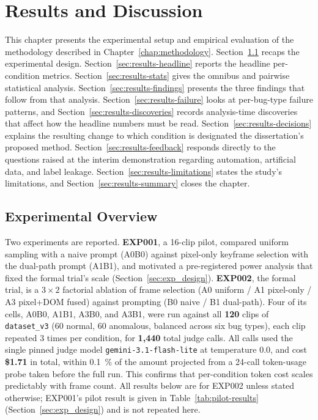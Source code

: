 \chapter{Results and Discussion}
\label{chap:results_and_discussion}
This chapter presents the experimental setup and empirical evaluation of the methodology described in Chapter~\ref{chap:methodology}. Section~\ref{sec:results-overview} recaps the experimental design. Section~\ref{sec:results-headline} reports the headline per-condition metrics. Section~\ref{sec:results-stats} gives the omnibus and pairwise statistical analysis. Section~\ref{sec:results-findings} presents the three findings that follow from that analysis. Section~\ref{sec:results-failure} looks at per-bug-type failure patterns, and Section~\ref{sec:results-discoveries} records analysis-time discoveries that affect how the headline numbers must be read. Section~\ref{sec:results-decisions} explains the resulting change to which condition is designated the dissertation's proposed method. Section~\ref{sec:results-feedback} responds directly to the questions raised at the interim demonstration regarding automation, artificial data, and label leakage. Section~\ref{sec:results-limitations} states the study's limitations, and Section~\ref{sec:results-summary} closes the chapter.

\section{Experimental Overview}
\label{sec:results-overview}
Two experiments are reported. \textbf{EXP001}, a 16-clip pilot, compared uniform sampling with a naive prompt (A0B0) against pixel-only keyframe selection with the dual-path prompt (A1B1), and motivated a pre-registered power analysis that fixed the formal trial's scale (Section~\ref{sec:exp_design}). \textbf{EXP002}, the formal trial, is a $3\times2$ factorial ablation of frame selection (A0 uniform / A1 pixel-only / A3 pixel+DOM fused) against prompting (B0 naive / B1 dual-path). Four of its cells, A0B0, A1B1, A3B0, and A3B1, were run against all \textbf{120} clips of \texttt{dataset\_v3} (60 normal, 60 anomalous, balanced across six bug types), each clip repeated 3 times per condition, for \textbf{1{,}440} total judge calls. All calls used the single pinned judge model \texttt{gemini-3.1-flash-lite} at temperature \num{0.0}, and cost \textbf{\$1.71} in total, within \SI{0.1}{\percent} of the amount projected from a 24-call token-usage probe taken before the full run. This confirms that per-condition token cost scales predictably with frame count. All results below are for EXP002 unless stated otherwise; EXP001's pilot result is given in Table~\ref{tab:pilot-results} (Section~\ref{sec:exp_design}) and is not repeated here.

